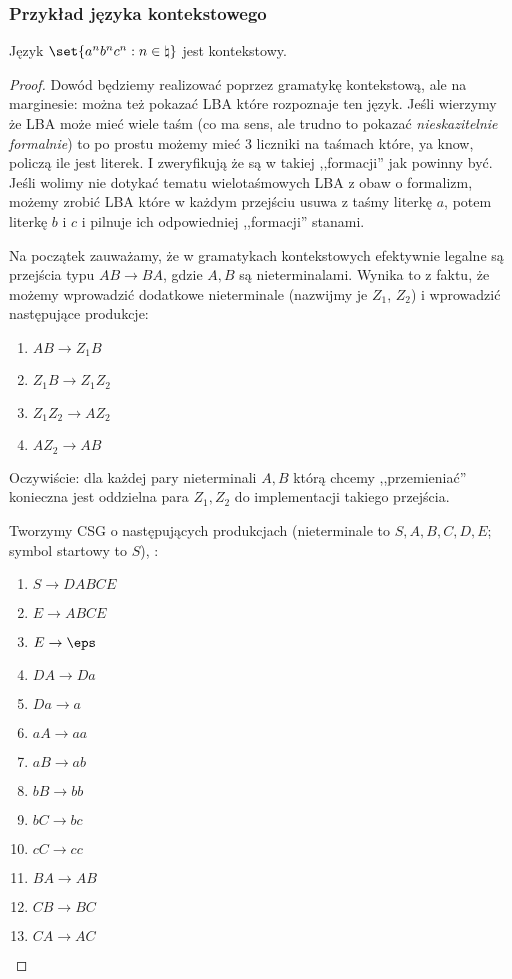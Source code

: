 \subsubsection{Przykład języka kontekstowego}
\label{csl_example}
\begin{theorem}
	Język \( \set{a^nb^nc^n : n \in \natural} \) jest kontekstowy.
\end{theorem}
\begin{proof}
	Dowód będziemy realizować poprzez gramatykę kontekstową, ale na marginesie: można też pokazać LBA które rozpoznaje ten język. Jeśli wierzymy że LBA może mieć wiele taśm (co ma sens, ale trudno to pokazać \textit{nieskazitelnie formalnie}) to po prostu możemy mieć 3 liczniki na taśmach które, ya know, policzą ile jest literek. I zweryfikują że są w takiej ,,formacji'' jak powinny być. Jeśli wolimy nie dotykać tematu wielotaśmowych LBA z obaw o formalizm, możemy zrobić LBA które w każdym przejściu usuwa z taśmy literkę \(a\), potem literkę \(b\) i \(c\) i pilnuje ich odpowiedniej ,,formacji'' stanami.


	Na początek zauważamy, że w gramatykach kontekstowych efektywnie legalne są przejścia typu \(AB \rightarrow BA\), gdzie \(A, B\) są nieterminalami. Wynika to z faktu, że możemy wprowadzić dodatkowe nieterminale (nazwijmy je \(Z_1\), \(Z_2\)) i wprowadzić następujące produkcje:

	\begin{enumerate}
		\item \(AB \rightarrow Z_1B\)
		\item \(Z_1B \rightarrow Z_1Z_2 \)
		\item \( Z_1Z_2 \rightarrow AZ_2 \)
		\item \( AZ_2 \rightarrow AB \)
	\end{enumerate}

	Oczywiście: dla każdej pary nieterminali \(A, B\) którą chcemy ,,przemieniać'' konieczna jest oddzielna para \(Z_1, Z_2\) do implementacji takiego przejścia.

	Tworzymy CSG o następujących produkcjach (nieterminale to \(S, A, B, C, D, E\); symbol startowy to \(S\)), :

	\begin{enumerate}
		\item \( S \rightarrow DABCE \)
		\item \( E \rightarrow ABCE \)
		\item \( E \rightarrow \eps \)
		\item \( DA \rightarrow Da \)
		\item \(Da \rightarrow a\)
		\item \( aA \rightarrow aa \)
		\item \(aB  \rightarrow ab\)
		\item \(bB \rightarrow bb\) \item \(bC \rightarrow bc\) \item \(cC \rightarrow cc\)
		\item \( BA \rightarrow AB \)
		\item \( CB \rightarrow BC \)
		\item \(CA \rightarrow AC\)
	\end{enumerate}


\end{proof}
